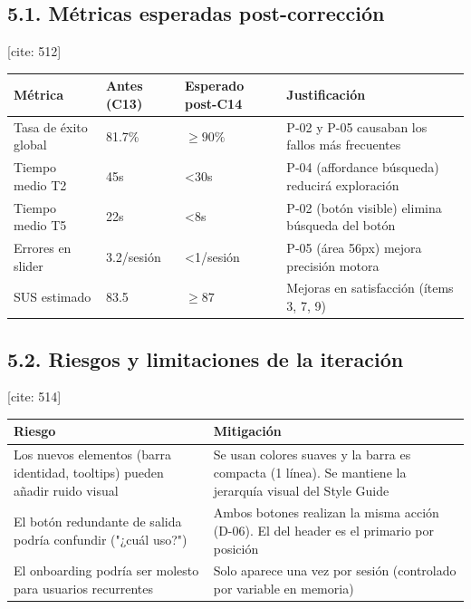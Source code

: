 \documentclass{article}
\begin{document}
\subsection{5.1. Métricas esperadas post-corrección} [cite: 512]
\begin{table}[h]
\centering
\begin{tabularx}{\textwidth}{llXl}
\toprule
\textbf{Métrica} & \textbf{Antes (C13)} & \textbf{Esperado post-C14} & \textbf{Justificación} \\ [cite: 513]
\midrule
Tasa de éxito global & 81.7\% & $\ge90\%$ & P-02 y P-05 causaban los fallos más frecuentes \\ [cite: 513]
Tiempo medio T2 & 45s & <30s & P-04 (affordance búsqueda) reducirá exploración \\ [cite: 513]
Tiempo medio T5 & 22s & <8s & P-02 (botón visible) elimina búsqueda del botón \\ [cite: 513]
Errores en slider & 3.2/sesión & <1/sesión & P-05 (área 56px) mejora precisión motora \\ [cite: 513]
SUS estimado & 83.5 & $\ge87$ & Mejoras en satisfacción (ítems 3, 7, 9) \\ [cite: 513]
\bottomrule
\end{tabularx}
\end{table}

\subsection{5.2. Riesgos y limitaciones de la iteración} [cite: 514]
\begin{table}[h]
\centering
\begin{tabularx}{\textwidth}{XX}
\toprule
\textbf{Riesgo} & \textbf{Mitigación} \\ [cite: 515]
\midrule
Los nuevos elementos (barra identidad, tooltips) pueden añadir ruido visual & Se usan colores suaves y la barra es compacta (1 línea). Se mantiene la jerarquía visual del Style Guide \\ [cite: 515]
El botón redundante de salida podría confundir ("¿cuál uso?") & Ambos botones realizan la misma acción (D-06). El del header es el primario por posición \\ [cite: 515]
El onboarding podría ser molesto para usuarios recurrentes & Solo aparece una vez por sesión (controlado por variable en memoria) \\ [cite: 515]
\bottomrule
\end{tabularx}
\end{table}
\end{document}
